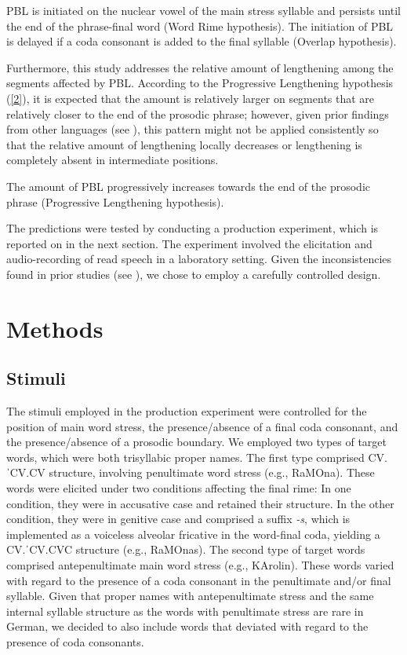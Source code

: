 \documentclass[output=paper]{langscibook}
\begin{document}
\ea \label{1}
    \ea PBL is initiated on the nuclear vowel of the main stress syllable and persists until the end of the phrase-final word (Word Rime hypothesis).
    \ex The initiation of PBL is delayed if a coda consonant is added to the final syllable (Overlap hypothesis).
    \z
\z

Furthermore, this study addresses the relative amount of lengthening among the segments affected by PBL. According to the Progressive Lengthening hypothesis (\ref{2}), it is expected that the amount is relatively larger on segments that are relatively closer to the end of the prosodic phrase; however, given prior findings from other languages (see ), this pattern might not be applied consistently so that the relative amount of lengthening locally decreases or lengthening is completely absent in intermediate positions.

\ea
The amount of PBL progressively increases towards the end of the prosodic phrase (Progressive Lengthening hypothesis).
\label{2}
\z

The predictions were tested by conducting a production experiment, which is reported on in the next section. The experiment involved the elicitation and audio-recording of read speech in a laboratory setting. Given the inconsistencies found in prior studies (see ), we chose to employ a carefully controlled design.

\section{Methods}\label{methods}
\subsection{Stimuli}\label{stimuli}
The stimuli employed in the production experiment were controlled for the position of main word stress, the presence\slash absence of a final coda consonant, and the presence\slash absence of a prosodic boundary. We employed two types of target words, which were both trisyllabic proper names. The first type comprised CV.ˈCV.CV structure, involving penultimate word stress (e.g., RaMOna). These words were elicited under two conditions affecting the final rime: In one condition, they were in accusative case and retained their structure. In the other condition, they were in genitive case and comprised a suffix \textit{-s}, which is implemented as a voiceless alveolar fricative in the word-final coda, yielding a CV.ˈCV.CVC structure (e.g., RaMOnas). The second type of target words comprised antepenultimate main word stress (e.g., KArolin). These words varied with regard to the presence of a coda consonant in the penultimate and\slash or final syllable. Given that proper names with antepenultimate stress and the same internal syllable structure as the words with penultimate stress are rare in German, we decided to also include words that deviated with regard to the presence of coda consonants.
\end{document}

